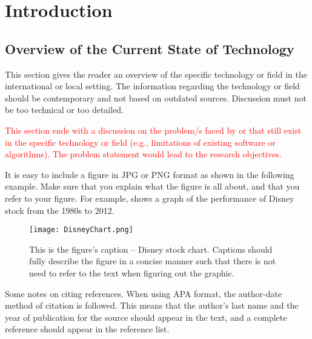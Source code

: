 \chapter{Introduction}
\label{sec:researchdesc}    %

\section{Overview of the Current State of Technology}
\label{sec:overview}

This section gives the reader an overview of the specific technology or field in the international or
local setting. 
The information regarding the technology or field should be contemporary and not based on outdated sources. 
Discussion must not be too technical or too detailed.
   
\textcolor{red}{This section ends with a discussion on the problem/s faced by or that still exist in the specific
technology or field (e.g., limitations of existing software or algorithms). 
The problem statement would lead to the research objectives.}


It is   easy to include a figure in JPG or PNG format as shown in the  following example.  
Make sure that you explain what the figure is all about, and that you refer to your figure.  
For example,  shows a graph of the performance of Disney stock from the 1980s to 2012.
  
\begin{figure}[t]                %
   \centering                    %
   \texttt{[image: DisneyChart.png]}      %
   \caption{This is the figure's caption -- Disney stock chart.
   	Captions should fully describe the figure in a concise manner  such that there is not need to refer to the text when figuring out the graphic.}
    \label{fig:disneystock}
\end{figure}


Some notes on citing references.   
When using APA format, the author-date method of citation is  followed.   
This means that the author's last name and the year of publication for the source should  appear in the text, and a complete reference should appear in the reference list.

